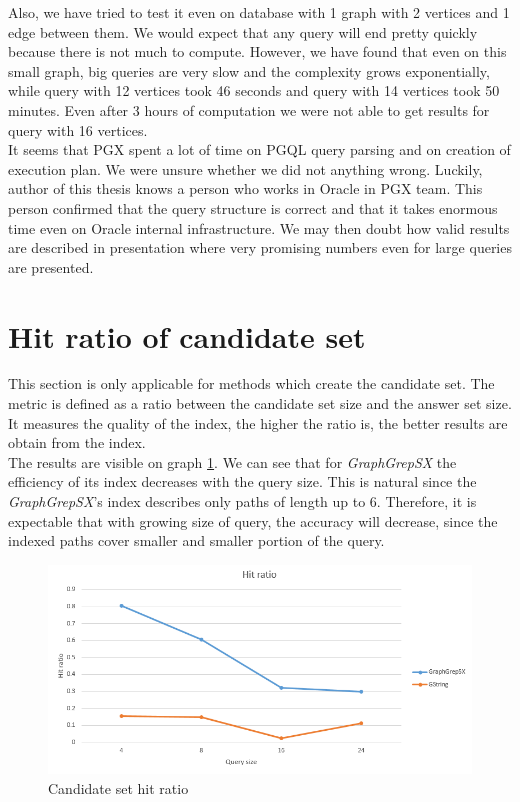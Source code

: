 Also, we have tried to test it even on database with 1 graph with 2 vertices and 1 edge between them. We would expect that any query will end pretty quickly because there is not much to compute. However, we have found that even on this small graph, big queries are very slow and the complexity grows exponentially, while query with 12 vertices took 46 seconds and query with 14 vertices took 50 minutes. Even after 3 hours of computation we were not able to get results for query with 16 vertices.\\

It seems that PGX spent a lot of time on PGQL query parsing and on creation of execution plan. We were unsure whether we did not anything wrong. Luckily, author of this thesis knows a person who works in Oracle in PGX team. This person confirmed that the query structure is correct and that it takes enormous time even on Oracle internal infrastructure. We may then doubt how valid results are described in presentation \cite{pgx-neo4j} where very promising numbers even for large queries are presented.

\section{Hit ratio of candidate set}
This section is only applicable for methods which create the candidate set. The metric is defined as a ratio between the candidate set size and the answer set size. It measures the quality of the index, the higher the ratio is, the better results are obtain from the index.\\

The results are visible on graph \ref{fig:hitratio}. We can see that for \textit{GraphGrepSX} the efficiency of its index decreases with the query size. This is natural since the \textit{GraphGrepSX}'s index describes only paths of length up to 6. Therefore, it is expectable that with growing size of query, the accuracy will decrease, since the indexed paths cover smaller and smaller portion of the query.\\

\begin{figure}[h]
	\centering
	\includegraphics[width=1\textwidth]{../img/hitRatio.png}
	\caption{Candidate set hit ratio}
	\label{fig:hitratio}
\end{figure}

